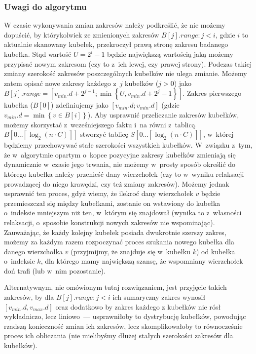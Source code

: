 \subsubsection{Uwagi do algorytmu}


W czasie wykonywania zmian zakresów należy podkreślić, że nie możemy dopuścić, by którykolwiek ze zmienionych zakresów $B \left[ j \right].range : j < i$, gdzie $i$ to aktualnie skanowany kubełek, przekroczył prawą stronę zakresu badanego kubełka. Stąd wartość $U = 2^{i} - 1$ będzie największą wartością jaką możemy przypisać nowym zakresom (czy to z~ich lewej, czy prawej strony).
Podczas takiej zmiany szerokość zakresów poszczególnych kubełków nie ulega zmianie.
Możemy zatem opisać nowe zakresy każdego z~$j$ kubełków ($j > 0$) jako $B \left[ j \right].range = \left[ v_{min}.d + 2 ^{j-1} ; \min \left\{ U, v_{min}.d + 2^{j} - 1 \right\} \right] \label{eq:radixHeapNewBucketRange}$.
Zakres pierwszego kubełka ($B \left[ 0 \right]$) zdefiniujemy jako $\left[ v_{min}.d ; v_{min}.d \right]$ (gdzie $v_{min}.d = \min \left\{ v \in B \left[ i \right] \right\}$).
Aby usprawnić przeliczanie zakresów kubełków, możemy skorzystać z~wcześniejszego faktu i~na równi z~tablicą $B \left[ 0 \dots \left \lceil \log_{2} \left( n \cdot C \right) \right \rceil \right]$ stworzyć tablicę $S \left[ 0 \dots \left \lceil \log_{2} \left( n \cdot C \right) \right \rceil \right]$, w~której będziemy przechowywać stałe szerokości wszystkich kubełków.
W~związku z~tym, że w~algorytmie opartym o~kopce pozycyjne zakresy kubełków zmieniają się dynamicznie w~czasie jego trwania, nie możemy w~prosty sposób określić do którego kubełka należy przenieść dany wierzchołek (czy to w~wyniku relaksacji prowadzącej do niego krawędzi, czy też zmiany zakresów).
Możemy jednak usprawnić ten proces, gdyż wiemy, że ilekroć dany wierzchołek $v$ będzie przemieszczał się między kubełkami, zostanie on wstawiony do kubełka o~indeksie mniejszym niż ten, w~którym się znajdował (wynika to z~własności relaksacji, o~sposobie konstrukcji nowych zakresów nie wspominając).
Zauważając, że każdy kolejny kubełek posiada dwukrotnie szerszy zakres, możemy za każdym razem rozpoczynać proces szukania nowego kubełka dla danego wierzchołka $v$ (przyjmijmy, że znajduje się w~kubełku $k$) od kubełka o~indeksie $k$, dla którego mamy największą szansę, że wspomniany wierzchołek doń trafi (lub w~nim pozostanie).

Alternatywnym, nie omówionym tutaj rozwiązaniem, jest przyjęcie takich zakresów, by dla $B \left[ j \right].range : j < i$ ich sumaryczny zakres wynosił $\left[ v_{min}.d, v_{max}.d \right]$ oraz dodatkowo by zakres każdego z kubełków nie rósł wykładniczo, lecz liniowo~--- usprawniłoby to dystrybucję kubełków, powodując rzadszą konieczność zmian ich zakresów, lecz skomplikowałoby to równocześnie proces ich obliczania (nie mielibyśmy dłużej stałych szerokości zakresów dla kubełków).


